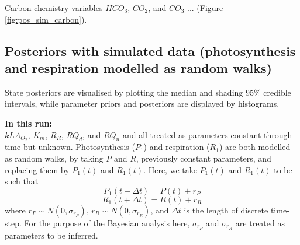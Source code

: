 \documentclass{ruthesis}
\begin{document}
Carbon chemistry variables $HCO_3$, $CO_2$, and $CO_3$ ... (Figure \ref{fig:pos_sim_carbon}).


\FloatBarrier
\subsection{Posteriors with simulated data (photosynthesis and respiration modelled as random walks)}\label{sec:micro_sim_results2}

State posteriors are visualised by plotting the median and shading 95\% credible intervals, while parameter priors and posteriors are displayed by histograms.

\textbf{In this run:}\\
$kLA_{O_2}$, $K_m$, $R_R$, $RQ_d$, and $RQ_n$ and all treated as parameters constant through time but unknown. 
Photosynthesis ($P_1$) and respiration ($R_1$) are both modelled as random walks, by taking \begin{math}P\end{math} and \begin{math}R\end{math}, previously constant parameters, and replacing them by \begin{math}P_1(t)\end{math} and \begin{math}R_1(t)\end{math}. Here, we take \begin{math}P_1(t)\end{math} and \begin{math}R_1(t)\end{math} to be such that
\begin{displaymath}
P_1(t+\Delta t) = P(t) + r_P
\end{displaymath}
\begin{displaymath}
R_1(t+\Delta t) = R(t) + r_R
\end{displaymath}
where \begin{math}
r_P \sim N(0, \sigma_{r_P})
\end{math}, \begin{math}
r_R \sim N(0, \sigma_{r_R})
\end{math}, and \begin{math}
\Delta t
\end{math} is the length of discrete time-step. For the purpose of the Bayesian analysis here, \begin{math}\sigma_{r_P}\end{math} and \begin{math}\sigma_{r_R}\end{math} are treated as parameters to be inferred. 
\end{document}
